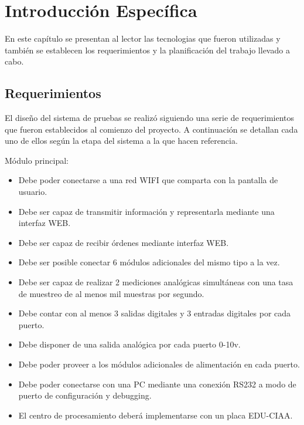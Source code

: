 \chapter{Introducción Específica} %

\label{Chapter2}

En este capítulo se presentan al lector las tecnologias que fueron utilizadas y también se establecen los requerimientos y la planificación del trabajo llevado a cabo.


\section{Requerimientos}
El diseño del sistema de pruebas se realizó siguiendo una serie de requerimientos que fueron establecidos al comienzo del proyecto. A continuación se detallan cada uno de ellos según la etapa del sistema a la que hacen referencia.

Módulo principal:

\begin{itemize}
	\item Debe poder conectarse a una red WIFI que comparta con la pantalla de usuario.
	\item Debe ser capaz de transmitir información y representarla mediante una interfaz WEB.
	\item Debe ser capaz de recibir órdenes mediante interfaz WEB.
	\item Debe ser posible conectar 6 módulos adicionales del mismo tipo a la vez.
	\item Debe ser capaz de realizar 2 mediciones analógicas simultáneas con una tasa de 	muestreo de al menos mil muestras por segundo.
	\item Debe contar con al menos 3 salidas digitales y 3 entradas digitales por cada puerto. 
	\item Debe disponer de una salida analógica por cada puerto 0-10v.	
	\item Debe poder proveer a los módulos adicionales de alimentación en cada puerto.
	\item Debe poder conectarse con una PC mediante una conexión RS232 a modo de 		puerto de configuración y debugging.
	\item El centro de procesamiento deberá implementarse con un placa EDU-CIAA.
	
\end{itemize}

